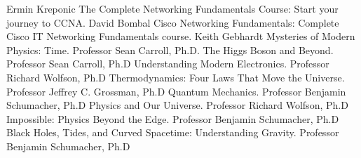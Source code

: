 \documentclass[]{friggeri-cv} %
\begin{document}
\begin{entrylist}
{Ermin Kreponic}
{\vspace{-3mm}}
\entry
{}
{The Complete Networking Fundamentals Course: {\normalfont\small{Start your journey to CCNA.}}}
{David Bombal}
{\vspace{-3mm}}
\entry
{}
{Cisco Networking Fundamentals: {\normalfont\small{Complete Cisco IT Networking Fundamentals course.}}}
{Keith Gebhardt}
{\vspace{-3mm}}
\entry
{}
{Mysteries of Modern Physics: Time{\normalfont\small{.}}}
{Professor Sean Carroll, Ph.D.}
{\vspace{-3mm}}
\entry
{}
{The Higgs Boson and Beyond{\normalfont\small{.}}}
{Professor Sean Carroll, Ph.D}
{\vspace{-3mm}}
\entry
{}
{Understanding Modern Electronics{\normalfont\small{.}}}
{Professor Richard Wolfson, Ph.D}
{\vspace{-3mm}}
\entry
{}
{Thermodynamics: Four Laws That Move the Universe{\normalfont\small{.}}}
{Professor Jeffrey C. Grossman, Ph.D}
{\vspace{-3mm}}
\entry
{}
{Quantum Mechanics{\normalfont\small{.}}}
{Professor Benjamin Schumacher, Ph.D}
{\vspace{-3mm}}
\entry
{}
{Physics and Our Universe{\normalfont\small{.}}}
{Professor Richard Wolfson, Ph.D}
{\vspace{-3mm}}
\entry
{}
{Impossible: Physics Beyond the Edge{\normalfont\small{.}}}
{Professor Benjamin Schumacher, Ph.D}
{\vspace{-3mm}}
\entry
{}
{Black Holes, Tides, and Curved Spacetime: Understanding Gravity{\normalfont\small{.}}}
{Professor Benjamin Schumacher, Ph.D}
{\vspace{-3mm}}
\end{entrylist}

\clearpage

\end{document}
